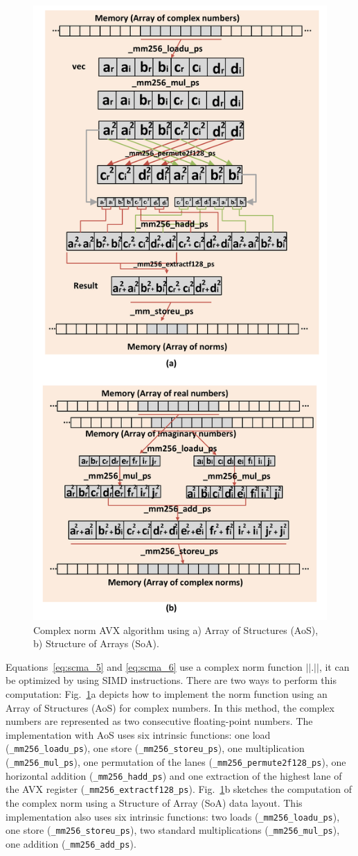 \begin{figure}
  \centering
  \includegraphics[width=0.70\linewidth]{scma/simd_norm/simd_norm}
  \caption{Complex norm AVX algorithm using
           a) Array of Structures (AoS),
           b) Structure of Arrays (SoA).}
  \label{fig:scma_simd_norm}
\end{figure}

Equations~\eqref{eq:scma_5} and \eqref{eq:scma_6} use a complex norm function
$||.||$, it can be optimized by using SIMD instructions. There are two ways to
perform this computation: Fig.~\ref{fig:scma_simd_norm}a depicts how to
implement the norm function using an Array of Structures (AoS) for complex
numbers. In this method, the complex numbers are represented as two consecutive
floating-point numbers. The implementation with AoS uses six intrinsic
functions: one load (\verb|_mm256_loadu_ps|), one store
(\verb|_mm256_storeu_ps|), one multiplication (\verb|_mm256_mul_ps|), one
permutation of the lanes (\verb|_mm256_permute2f128_ps|), one horizontal
addition (\verb|_mm256_hadd_ps|) and one extraction of the highest lane of the
AVX register (\verb|_mm256_extractf128_ps|). Fig.~\ref{fig:scma_simd_norm}b
sketches the computation of the complex norm using a Structure of Array (SoA)
data layout. This implementation also uses six intrinsic functions: two loads
(\verb|_mm256_loadu_ps|), one store (\verb|_mm256_storeu_ps|), two standard
multiplications (\verb|_mm256_mul_ps|), one addition (\verb|_mm256_add_ps|).

